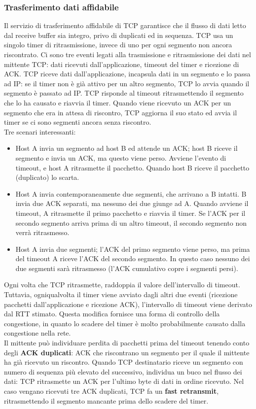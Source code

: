 \documentclass[11pt]{article}
\begin{document}
\subsubsection{Trasferimento dati affidabile}
Il servizio di trasferimento affidabile di TCP garantisce che il flusso di dati letto dal receive buffer sia integro, 
privo di duplicati ed in sequenza.
TCP usa un singolo timer di ritrasmissione, invece di uno per ogni segmento non ancora riscontrato.
Ci sono tre eventi legati alla trasmissione e ritrasmissione dei dati nel mittente TCP: dati ricevuti dall'applicazione, 
timeout del timer e ricezione di ACK. TCP riceve dati dall'applicazione, incapsula dati in un segmento e lo passa ad IP:
se il timer non è già attivo per un altro segmento, TCP lo avvia quando il segmento è passato ad IP.
TCP risponde al timeout ritrasmettendo il segmento che lo ha causato e riavvia il timer.
Quando viene ricevuto un ACK per un segmento che era in attesa di riscontro, TCP aggiorna il suo stato ed avvia il timer 
se ci sono segmenti ancora senza riscontro.\\
Tre scenari interessanti:
\begin{itemize}
    \item Host A invia un segmento ad host B ed attende un ACK; host B riceve il segmento e invia un ACK, ma questo viene 
    perso. Avviene l'evento di timeout, e host A ritrasmette il pacchetto. Quando host B riceve il pacchetto (duplicato) 
    lo scarta.
    \item Host A invia contemporaneamente due segmenti, che arrivano a B intatti. B invia due ACK separati, ma nessuno dei 
    due giunge ad A. Quando avviene il timeout, A ritrasmette il primo pacchetto e riavvia il timer. Se l'ACK per il 
    secondo segmento arriva prima di un altro timeout, il secondo segmento non verrà ritrasmesso.
    \item Host A invia due segmenti; l'ACK del primo segmento viene perso, ma prima del timeout A riceve l'ACK del secondo 
    segmento. In questo caso nessuno dei due segmenti sarà ritrasmesso (l'ACK cumulativo copre i segmenti persi).
\end{itemize}
Ogni volta che TCP ritrasmette, raddoppia il valore dell'intervallo di timeout. Tuttavia, ogniqualvolta il timer viene 
avviato dagli altri due eventi (ricezione pacchetti dall'applicazione e ricezione ACK), l'intervallo di timeout viene 
derivato dal RTT stimato.
Questa modifica fornisce una forma di controllo della congestione, in quanto lo scadere del timer è molto probabilmente 
causato dalla congestione nella rete.\\
Il mittente può individuare perdita di pacchetti prima del timeout tenendo conto degli \textbf{ACK duplicati}: ACK che 
riscontrano un segmento per il quale il mittente ha già ricevuto un riscontro.
Quando TCP destinatario riceve un segmento con numero di sequenza più elevato del successivo, individua un buco nel flusso 
dei dati: TCP ritrasmette un ACK per l'ultimo byte di dati in ordine ricevuto. 
Nel caso vengano ricevuti tre ACK duplicati, TCP fa un \textbf{fast retransmit}, ritrasmettendo il segmento mancante prima 
dello scadere del timer.
\end{document}
